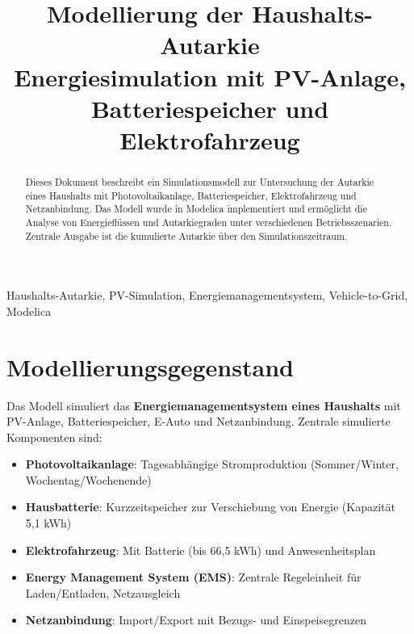 \documentclass[conference]{IEEEtran}
\begin{document}
\title{Modellierung der Haushalts-Autarkie\\ 
{\footnotesize Energiesimulation mit PV-Anlage, Batteriespeicher und Elektrofahrzeug}}

\author{
}

\maketitle

\begin{abstract}
Dieses Dokument beschreibt ein Simulationsmodell zur Untersuchung der Autarkie eines Haushalts mit Photovoltaikanlage, Batteriespeicher, Elektrofahrzeug und Netzanbindung. Das Modell wurde in Modelica implementiert und ermöglicht die Analyse von Energieflüssen und Autarkiegraden unter verschiedenen Betriebsszenarien. Zentrale Ausgabe ist die kumulierte Autarkie über den Simulationszeitraum.
\end{abstract}

\begin{IEEEkeywords}
Haushalts-Autarkie, PV-Simulation, Energiemanagementsystem, Vehicle-to-Grid, Modelica
\end{IEEEkeywords}

\section{Modellierungsgegenstand}

Das Modell simuliert das \textbf{Energiemanagementsystem eines Haushalts} mit PV-Anlage, Batteriespeicher, E-Auto und Netzanbindung. Zentrale simulierte Komponenten sind:

\begin{itemize}
\item \textbf{Photovoltaikanlage}: Tagesabhängige Stromproduktion (Sommer/Winter, Wochentag/Wochenende)
\item \textbf{Hausbatterie}: Kurzzeitspeicher zur Verschiebung von Energie (Kapazität 5,1 kWh)
\item \textbf{Elektrofahrzeug}: Mit Batterie (bis 66,5 kWh) und Anwesenheitsplan
\item \textbf{Energy Management System (EMS)}: Zentrale Regeleinheit für Laden/Entladen, Netzausgleich
\item \textbf{Netzanbindung}: Import/Export mit Bezugs- und Einspeisegrenzen
\end{itemize}
\end{document}
